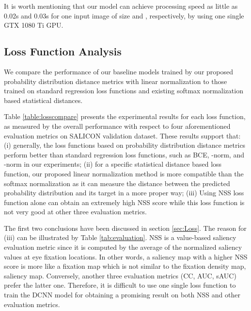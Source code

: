 It is worth mentioning that our model can achieve processing speed as little as 0.02s and 0.03s for one input image of size  and , respectively, by using one single GTX 1080 Ti GPU. 

\subsection{Loss Function Analysis} 
\label{lossfa}
We compare the performance of our baseline models trained by our proposed probability distribution distance metrics with linear normalization to those trained on standard regression loss functions and existing softmax normalization based statistical distances. 

Table \ref{table:losscompare} presents the experimental results for each loss function, as measured by the overall performance with respect to four aforementioned evaluation metrics on SALICON validation dataset. These results support that: (i) generally, the loss functions based on probability distribution distance metrics perform better than standard regression loss functions, such as BCE, -norm, and -norm in our experiments; (ii) for a specific statistical distance based loss function, our proposed linear normalization method is more compatible than the softmax normalization as it can measure the distance between the predicted probability distribution and its target in a more proper way; (iii) Using NSS loss function alone can obtain an extremely high NSS score while this loss function is not very good at other three evaluation metrics. 

The first two conclusions have been discussed in section \ref{sec:Loss}. The reason for (iii) can be illustrated by Table \ref{tab:evaluation}. NSS is a value-based saliency evaluation metric since it is computed by the average of the normalized saliency values at eye fixation locations. In other words, a saliency map with a higher NSS score is more like a fixation map which is not similar to the fixation density map, \ie saliency map. Conversely, another three evaluation metrics (CC, AUC, sAUC) prefer the latter one. Therefore, it is difficult to use one single loss function to train the DCNN model for obtaining a promising result on both NSS and other evaluation metrics. 





